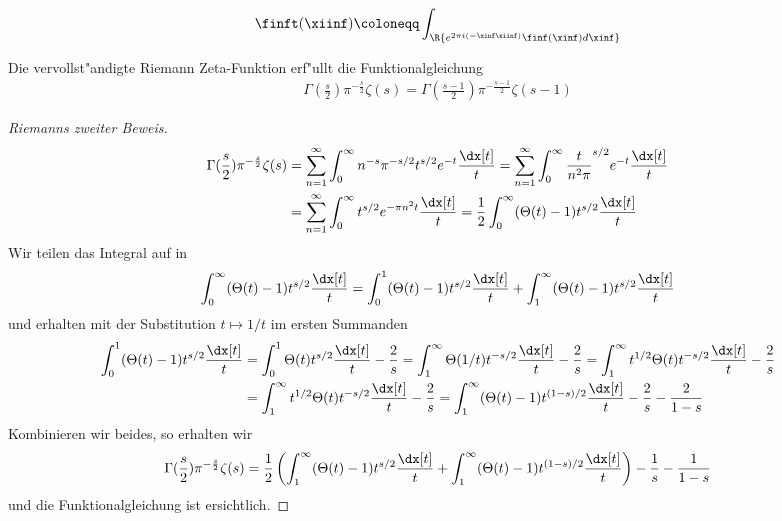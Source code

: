 	\begin{defi}
		\label{def:fourier}
		
		\begin{align}
			\finft(\xiinf) \coloneqq  \int_\R{e^{ 2\pi i (-\xinf\xiinf) }\finf(\xinf)d\xinf}
		\end{align}
	\end{defi}
	
	\begin{satz}
		Die vervollst"andigte Riemann Zeta-Funktion erf"ullt die Funktionalgleichung
		\begin{align*}
			\Gamma(\frac{s}{2}) \pi^{-\frac{s}{2}} \zeta(s) = \Gamma(\frac{s-1}{2}) \pi^{-\frac{s-1}{2}} \zeta(s-1)
		\end{align*}
	\end{satz}
	\begin{proof}[Riemanns zweiter Beweis]
		\begin{align*}
			\Gamma(\frac{s}{2}) \pi^{-\frac{s}{2}} \zeta(s)
				&= \sum_{n=1}^{\infty}  \int_{0}^{\infty} n^{-s} \pi^{-s/2} t^{s/2} e^{-t} \frac{\dx[t]}{t}
				= \sum_{n=1}^{\infty}  \int_{0}^{\infty} \frac{t}{n^2\pi}^{s/2} e^{-t} \frac{\dx[t]}{t}\\
				&= \sum_{n=1}^{\infty}  \int_{0}^{\infty} t^{s/2} e^{-\pi n^2 t} \frac{\dx[t]}{t}
				= \frac{1}{2} \int_{0}^{\infty} (\Theta(t) - 1) t^{s/2}  \frac{\dx[t]}{t} \\
		\end{align*}
		Wir teilen das Integral auf in
		\begin{align*}
			\int_{0}^{\infty} (\Theta(t) - 1) t^{s/2}  \frac{\dx[t]}{t} = \int_{0}^{1} (\Theta(t) - 1) t^{s/2}  \frac{\dx[t]}{t} + \int_{1}^{\infty} (\Theta(t) - 1) t^{s/2}  \frac{\dx[t]}{t}
		\end{align*}
		und erhalten mit der Substitution $t \mapsto 1/t$ im ersten Summanden
		\begin{align*}
			\int_{0}^{1} (\Theta(t) - 1) t^{s/2}  \frac{\dx[t]}{t} 
				&= \int_{0}^{1} \Theta(t) t^{s/2}  \frac{\dx[t]}{t} - \frac{2}{s} 
				= \int_{1}^{\infty} \Theta(1/t) t^{-s/2}  \frac{\dx[t]}{t} - \frac{2}{s}
				= \int_{1}^{\infty} t^{1/2} \Theta(t) t^{-s/2}  \frac{\dx[t]}{t} - \frac{2}{s}\\
				&= \int_{1}^{\infty} t^{1/2} \Theta(t) t^{-s/2}  \frac{\dx[t]}{t} - \frac{2}{s}
				= \int_{1}^{\infty} (\Theta(t) - 1) t^{(1-s)/2}  \frac{\dx[t]}{t} - \frac{2}{s} - \frac{2}{1-s}
		\end{align*}
		Kombinieren wir beides, so erhalten wir
		\begin{align*}
			\Gamma(\frac{s}{2}) \pi^{-\frac{s}{2}} \zeta(s)
				= \frac{1}{2} \left( \int_{1}^{\infty} (\Theta(t) - 1) t^{s/2}  \frac{\dx[t]}{t} + \int_{1}^{\infty} (\Theta(t) - 1) t^{(1-s)/2}  \frac{\dx[t]}{t} \right)  - \frac{1}{s} - \frac{1}{1-s}
		\end{align*}
		und die Funktionalgleichung ist ersichtlich.
		
	\end{proof}
	
